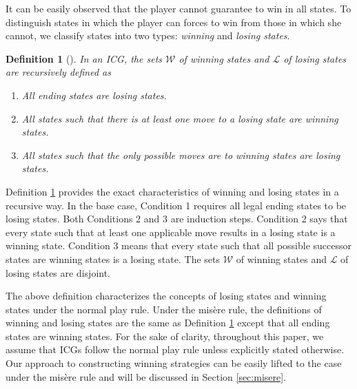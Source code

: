 \documentclass[review]{elsarticle}
\newcommand{\set}[1]{\{ #1 \}}
\newcommand{\winSet}{\mathcal{W}}
\newcommand{\loseSet}{\mathcal{L}}
\newcommand{\constraint}{\mathcal{C}}
\newcommand{\estate}{\mathcal{E}}
\newtheorem{definition}{Definition}
\begin{document}
	
	It can be easily observed that the player cannot guarantee to win in all states.
	To distinguish states in which the player can forces to win from those in which she cannot, we classify states into two types: \textit{winning} and \textit{losing states}.
	\begin{definition}[\cite{Fer2018}] \label{def:wlState} \rm
		In an ICG, the sets $\winSet$ of winning states and $\loseSet$ of losing states are recursively defined as
		\begin{enumerate}
			\item All ending states are losing states.
			\item All states such that there is at least one move to a losing state are winning states.
			\item All states such that the only possible moves are to winning states are losing states.
		\end{enumerate}
		
%
	\end{definition}
	
	Definition \ref{def:wlState} provides the exact characteristics of winning and losing states in a recursive way.
	In the base case, Condition 1 requires all legal ending states to be losing states. Both Conditions 2 and 3 are induction steps.
	Condition 2 says that every state such that at least one applicable move results in a losing state is a winning state.
	Condition 3 means that every state such that all possible successor states are winning states is a losing state.
	The sets $\winSet$ of winning states and $\loseSet$ of losing states are disjoint.
	
	The above definition characterizes the concepts of losing states and winning states under the normal play rule.
	Under the mis\`{e}re rule, the definitions of winning and losing states are the same as Definition \ref{def:wlState} except that all ending states are winning states.
	For the sake of clarity, throughout this paper, we assume that ICGs follow the normal play rule unless explicitly stated otherwise.
	Our approach to constructing winning strategies can be easily lifted to the case under the mis\`{e}re rule and will be discussed in Section \ref{sec:misere}.
\end{document}
